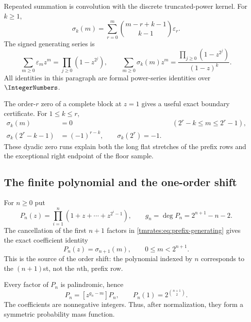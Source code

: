 \documentclass[11pt,oneside]{article}
\theoremstyle{definition}
\theoremstyle{remark}
\begin{document}
Repeated summation is convolution with the discrete truncated-power kernel.  For $k\ge1$,
\begin{equation}
 \sigma_k(m)=\sum_{r=0}^{m}\binom{m-r+k-1}{k-1}\varepsilon_r. \label{tmrates:eq:prefix-convolution}
\end{equation}
The signed generating series is
\begin{equation}
 \sum_{m\ge0}\varepsilon_m z^m=\prod_{j\ge0}(1-z^{2^j}),
 \qquad
 \sum_{m\ge0}\sigma_k(m)z^m
 =\frac{\prod_{j\ge0}(1-z^{2^j})}{(1-z)^k}.               \label{tmrates:eq:prefix-generating}
\end{equation}
All identities in this paragraph are formal power-series identities over $\IntegerNumbers$.

The order-$r$ zero of a complete block at $z=1$ gives a useful exact boundary
certificate.  For $1\le k\le r$,
\begin{align}
 \sigma_k(m)&=0 &&(2^r-k\le m\le2^r-1),
 \label{tmrates:eq:zero-run}\\
 \sigma_k(2^r-k-1)&=(-1)^{r-k},\qquad
 \sigma_k(2^r)=-1.
 \label{tmrates:eq:zero-run-boundary}
\end{align}
These dyadic zero runs explain both the long flat stretches of the prefix rows and the
exceptional right endpoint of the floor sample.

\subsection{The finite polynomial and the one-order shift}

For $n\ge0$ put
\begin{equation}
 P_n(z)=\prod_{i=1}^{n}(1+z+\cdots+z^{2^i-1}),
 \qquad
 g_n=\deg P_n=2^{n+1}-n-2.                                \label{tmrates:eq:Pn}
\end{equation}
The cancellation of the first $n+1$ factors in \eqref{tmrates:eq:prefix-generating} gives the exact
coefficient identity
\begin{equation}
 [z^m]P_n(z)=\sigma_{n+1}(m),
 \qquad 0\le m<2^{n+1}.                                   \label{tmrates:eq:coefficient-bridge}
\end{equation}
This is the source of the order shift: the polynomial indexed by $n$ corresponds to the
$(n+1)$st, not the $n$th, prefix row.

Every factor of $P_n$ is palindromic, hence
\begin{equation}
 [z^m]P_n=[z^{g_n-m}]P_n,
 \qquad
 P_n(1)=2^{\binom{n+1}{2}}.                               \label{tmrates:eq:Pn-symmetry-mass}
\end{equation}
The coefficients are nonnegative integers.  Thus, after normalization, they form a symmetric
probability mass function.
\end{document}
